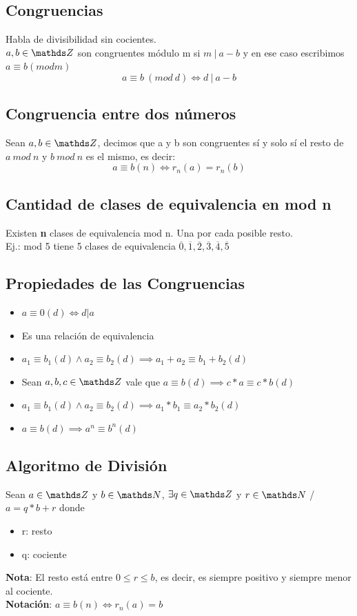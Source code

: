 \documentclass[10pt,a4paper]{article}
\begin{document}
\subsection*{Congruencias}
Habla de divisibilidad sin cocientes. \\
$a, b \in \ent$ son congruentes módulo m si $m \ | \ a-b$ y en ese caso escribimos $a \equiv b (mod m)$ \\
\[a \equiv b \ (mod \ d) \iff d \ | \ a - b \] 
\subsection*{Congruencia entre dos números}
Sean $a, b \in \ent$, decimos que a y b son congruentes sí y solo sí el resto de $ a \ mod \ n$ y $b \ mod \ n$ es el mismo, es decir: \\
\[a \equiv b(n) \iff r_{n}(a) = r_{n}(b)\]
\subsection*{Cantidad de clases de equivalencia en mod n}
Existen \textbf{n} clases de equivalencia mod n. Una por cada posible resto. \\
Ej.: mod 5 tiene 5 clases de equivalencia $\overline{0}, \overline{1}, \overline{2}, \overline{3}, \overline{4}, \overline{5}$
\subsection*{Propiedades de las Congruencias}
\begin{itemize}
    \item $a \equiv 0(d) \iff d | a$
    \item Es una relación de equivalencia
    \item $a_{1} \equiv b_{1}(d) \land a_{2} \equiv b_{2}(d) \implies a_{1} + a_{2} \equiv b_{1} + b_{2}(d)$
    \item Sean $a, b, c \in \ent$ vale que $a \equiv b(d) \implies c * a \equiv c * b (d)$
    \item $a_{1} \equiv b_{1}(d) \land a_{2} \equiv b_{2}(d) \implies a_{1} * b_{1} \equiv a_{2} * b_{2}(d)$
    \item $a \equiv b(d) \implies a^{n} \equiv b^{n}(d)$
\end{itemize}
\subsection*{Algoritmo de División}
Sean $a \in \ent$ y $b \in \nat$, $\exists q \in \ent$ y $r \in \nat$ / $a = q * b + r$ donde 
\begin{itemize}
    \item r: resto 
    \item q: cociente 
\end{itemize}
\textbf{Nota}: El resto está entre $0 \le r \le b$, es decir, es siempre positivo y siempre menor al cociente. \\
\textbf{Notación}: $a \equiv b(n) \iff r_{n}(a) = b$
\end{document}
